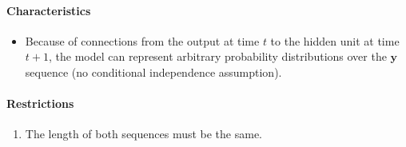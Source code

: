 \documentclass[12pt, a4paper]{article}
\def\vy{\boldsymbol{y}}
\begin{document}
\paragraph{Characteristics}
\begin{itemize}
    \item Because of connections from the output at time $t$ to the hidden unit at time $t+1$, the model can represent arbitrary probability distributions over the $\vy$ sequence (no conditional independence assumption).
\end{itemize}
\paragraph{Restrictions}
\begin{enumerate}
    \item The length of both sequences must be the same.
\end{enumerate}
\end{document}
